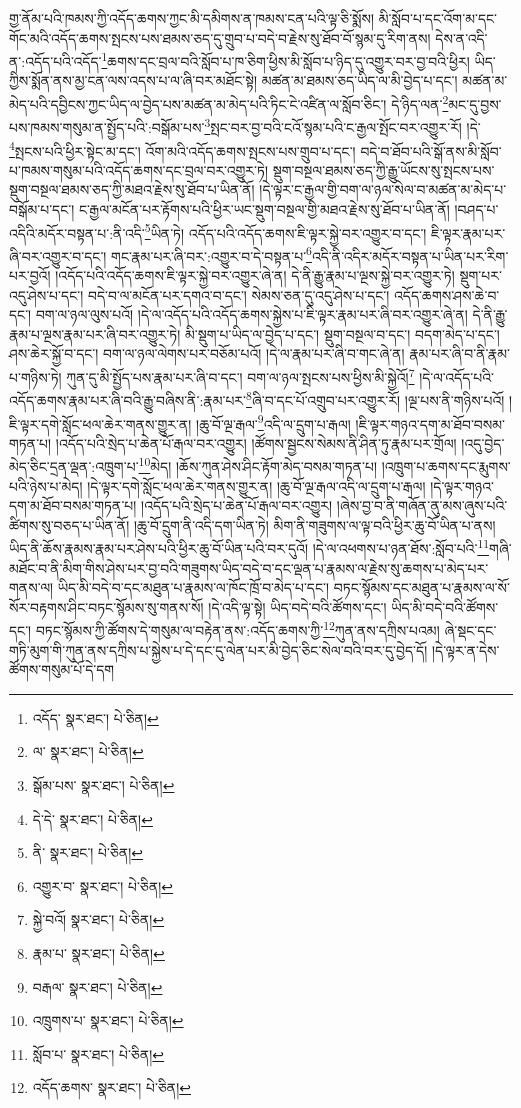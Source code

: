 གྱ་ནོམ་པའི་ཁམས་ཀྱི་འདོད་ཆགས་ཀྱང་མི་དམིགས་ན་ཁམས་ངན་པའི་ལྟ་ཅི་སྨོས། མི་སློབ་པ་དང་འོག་མ་དང་གོང་མའི་འདོད་ཆགས་སྤངས་པས་ཐམས་ཅད་དུ་གྲུབ་པ་བདེ་བ་རྗེས་སུ་ཐོབ་བོ་སྙམ་དུ་རིག་ནས། དེས་ན་འདི་ན་:འདོད་པའི་འདོད་\footnote{འདོད་  སྣར་ཐང་།  པེ་ཅིན། }ཆགས་དང་བྲལ་བའི་སློབ་པ་ཁ་ཅིག་ཕྱིས་མི་སློབ་པ་ཉིད་དུ་འགྱུར་བར་བྱ་བའི་ཕྱིར། ཡིད་ཀྱིས་སྨོན་ནས་མྱ་ངན་ལས་འདས་པ་ལ་ཞི་བར་མཐོང་སྟེ། མཚན་མ་ཐམས་ཅད་ཡིད་ལ་མི་བྱེད་པ་དང་། མཚན་མ་མེད་པའི་དབྱིངས་ཀྱང་ཡིད་ལ་བྱེད་པས་མཚན་མ་མེད་པའི་ཏིང་ངེ་འཛིན་ལ་སློབ་ཅིང་། དེ་ཉིད་ལན་\footnote{ལ་  སྣར་ཐང་།  པེ་ཅིན། }མང་དུ་བྱས་པས་ཁམས་གསུམ་ན་སྤྱོད་པའི་:བསྒོམ་པས་\footnote{སྒོམ་པས་  སྣར་ཐང་།  པེ་ཅིན། }སྤང་བར་བྱ་བའི་ངའོ་སྙམ་པའི་ང་རྒྱལ་སྤོང་བར་འགྱུར་རོ། །དེ་\footnote{དེ་དེ་  སྣར་ཐང་།  པེ་ཅིན། }སྤངས་པའི་ཕྱིར་སྟེང་མ་དང་། འོག་མའི་འདོད་ཆགས་སྤངས་པས་གྲུབ་པ་དང་། བདེ་བ་ཐོབ་པའི་སྒོ་ནས་མི་སློབ་པ་ཁམས་གསུམ་པའི་འདོད་ཆགས་དང་བྲལ་བར་འགྱུར་ཏེ། སྡུག་བསྔལ་ཐམས་ཅད་ཀྱི་རྒྱུ་ཡོངས་སུ་སྤངས་པས་སྡུག་བསྔལ་ཐམས་ཅད་ཀྱི་མཐའ་རྗེས་སུ་ཐོབ་པ་ཡིན་ནོ། །དེ་ལྟར་ང་རྒྱལ་གྱི་བག་ལ་ཉལ་སེལ་བ་མཚན་མ་མེད་པ་བསྒོམ་པ་དང་། ང་རྒྱལ་མངོན་པར་རྟོགས་པའི་ཕྱིར་ཡང་སྡུག་བསྔལ་གྱི་མཐའ་རྗེས་སུ་ཐོབ་པ་ཡིན་ནོ། །བཤད་པ་འདིའི་མདོར་བསྟན་པ་:ནི་འདི་\footnote{ནི་  སྣར་ཐང་།  པེ་ཅིན། }ཡིན་ཏེ། འདོད་པའི་འདོད་ཆགས་ཇི་ལྟར་སྐྱེ་བར་འགྱུར་བ་དང་། ཇི་ལྟར་རྣམ་པར་ཞི་བར་འགྱུར་བ་དང་། གང་རྣམ་པར་ཞི་བར་:འགྱུར་བ་དེ་བསྟན་པ་\footnote{འགྱུར་བ་  སྣར་ཐང་།  པེ་ཅིན། }འདི་ནི་འདིར་མདོར་བསྟན་པ་ཡིན་པར་རིག་པར་བྱའོ། །འདོད་པའི་འདོད་ཆགས་ཇི་ལྟར་སྐྱེ་བར་འགྱུར་ཞེ་ན། དེ་ནི་རྒྱུ་རྣམ་པ་ལྔས་སྐྱེ་བར་འགྱུར་ཏེ། སྡུག་པར་འདུ་ཤེས་པ་དང་། བདེ་བ་ལ་མངོན་པར་དགའ་བ་དང་། སེམས་ཅན་དུ་འདུ་ཤེས་པ་དང་། འདོད་ཆགས་ཤས་ཆེ་བ་དང་། བག་ལ་ཉལ་ལུས་པའོ། །དེ་ལ་འདོད་པའི་འདོད་ཆགས་སྐྱེས་པ་ཇི་ལྟར་རྣམ་པར་ཞི་བར་འགྱུར་ཞེ་ན། དེ་ནི་རྒྱུ་རྣམ་པ་ལྔས་རྣམ་པར་ཞི་བར་འགྱུར་ཏེ། མི་སྡུག་པ་ཡིད་ལ་བྱེད་པ་དང་། སྡུག་བསྔལ་བ་དང་། བདག་མེད་པ་དང་། ཤས་ཆེར་སྐྱོ་བ་དང་། བག་ལ་ཉལ་ལེགས་པར་བཅོམ་པའོ། །དེ་ལ་རྣམ་པར་ཞི་བ་གང་ཞེ་ན། རྣམ་པར་ཞི་བ་ནི་རྣམ་པ་གཉིས་ཏེ། ཀུན་དུ་མི་སྤྱོད་པས་རྣམ་པར་ཞི་བ་དང་། བག་ལ་ཉལ་སྤངས་པས་ཕྱིས་མི་སྐྱེའོ།\footnote{སྐྱེ་བའོ།  སྣར་ཐང་།  པེ་ཅིན། } །དེ་ལ་འདོད་པའི་འདོད་ཆགས་རྣམ་པར་ཞི་བའི་རྒྱུ་བཞིས་ནི་:རྣམ་པར་\footnote{རྣམ་པ་  སྣར་ཐང་།  པེ་ཅིན། }ཞི་བ་དང་པོ་འགྲུབ་པར་འགྱུར་རོ། །ལྔ་པས་ནི་གཉིས་པའོ། །ཇི་ལྟར་དགེ་སློང་ཕལ་ཆེར་གནས་གྱུར་ན། །ཆུ་བོ་ལྔ་རྒལ་\footnote{བརྒལ་  སྣར་ཐང་།  པེ་ཅིན། }འདི་ལ་དྲུག་པ་རྒལ། །ཇི་ལྟར་གཉའ་དག་མ་ཐོབ་བསམ་གཏན་པ། །འདོད་པའི་སྲེད་པ་ཆེན་པོ་རྒལ་བར་འགྱུར། །ཚོགས་སྦྱངས་སེམས་ནི་ཤིན་ཏུ་རྣམ་པར་གྲོལ། །འདུ་བྱེད་མེད་ཅིང་དྲན་ལྡན་:འཁྲུག་པ་\footnote{འཁྲུགས་པ་  སྣར་ཐང་།  པེ་ཅིན། }མེད། །ཆོས་ཀུན་ཤེས་ཤིང་རྟོག་མེད་བསམ་གཏན་པ། །འཁྲུག་པ་ཆགས་དང་རྨུགས་པའི་ཉེས་པ་མེད། །དེ་ལྟར་དགེ་སློང་ཕལ་ཆེར་གནས་གྱུར་ན། །ཆུ་བོ་ལྔ་རྒལ་འདི་ལ་དྲུག་པ་རྒལ། །དེ་ལྟར་གཉའ་དག་མ་ཐོབ་བསམ་གཏན་པ། །འདོད་པའི་སྲེད་པ་ཆེན་པོ་རྒལ་བར་འགྱུར། །ཞེས་བྱ་བ་ནི་གཞོན་ནུ་མས་ཞུས་པའི་ཚིགས་སུ་བཅད་པ་ཡིན་ནོ། །ཆུ་བོ་དྲུག་ནི་འདི་དག་ཡིན་ཏེ། མིག་ནི་གཟུགས་ལ་ལྟ་བའི་ཕྱིར་ཆུ་བོ་ཡིན་པ་ནས། ཡིད་ནི་ཆོས་རྣམས་རྣམ་པར་ཤེས་པའི་ཕྱིར་ཆུ་བོ་ཡིན་པའི་བར་དུའོ། །དེ་ལ་འཕགས་པ་ཉན་ཐོས་:སློབ་པའི་\footnote{སློབ་པ་  སྣར་ཐང་།  པེ་ཅིན། }གཞི་མཐོང་བ་ནི་མིག་གིས་ཤེས་པར་བྱ་བའི་གཟུགས་ཡིད་བདེ་བ་དང་ལྡན་པ་རྣམས་ལ་རྗེས་སུ་ཆགས་པ་མེད་པར་གནས་ལ། ཡིད་མི་བདེ་བ་དང་མཐུན་པ་རྣམས་ལ་ཁོང་ཁྲོ་བ་མེད་པ་དང་། བཏང་སྙོམས་དང་མཐུན་པ་རྣམས་ལ་སོ་སོར་བརྟགས་ཤིང་བཏང་སྙོམས་སུ་གནས་སོ། །དེ་འདི་ལྟ་སྟེ། ཡིད་བདེ་བའི་ཚོགས་དང་། ཡིད་མི་བདེ་བའི་ཚོགས་དང་། བཏང་སྙོམས་ཀྱི་ཚོགས་དེ་གསུམ་ལ་བརྟེན་ནས་:འདོད་ཆགས་ཀྱི་\footnote{འདོད་ཆགས་  སྣར་ཐང་།  པེ་ཅིན། }ཀུན་ནས་དཀྲིས་པའམ། ཞེ་སྡང་དང་གཏི་མུག་གི་ཀུན་ནས་དཀྲིས་པ་སྐྱེས་པ་དེ་དང་དུ་ལེན་པར་མི་བྱེད་ཅིང་སེལ་བའི་བར་དུ་བྱེད་དོ། །དེ་ལྟར་ན་དེས་ཚོགས་གསུམ་པོ་དེ་དག 